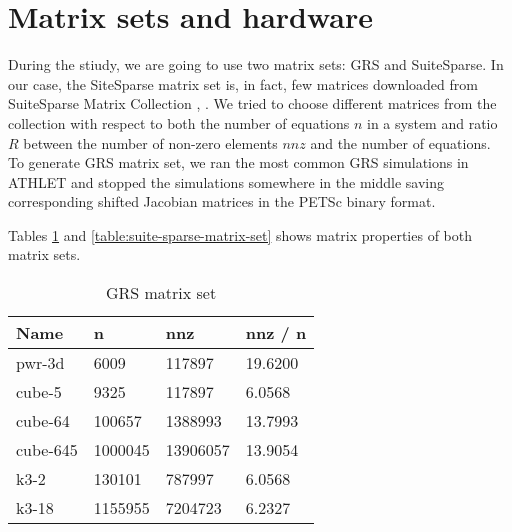 \section{Matrix sets and hardware} \label{subseq:matrix-sets-and-hardware}

During the stiudy, we are going to use two matrix sets: GRS and SuiteSparse. In our case, the SiteSparse matrix set is, in fact, few matrices downloaded from SuiteSparse Matrix Collection \cite{sparse-matrix-collection:1}, \cite{sparse-matrix-collection:2}. We tried to choose different matrices from the collection with respect to both the number of equations $n$ in a system and ratio $R$ between the number of non-zero elements $nnz$ and the number of equations.\\ 


To generate GRS matrix set, we ran the most common GRS simulations in ATHLET and stopped the simulations somewhere in the middle saving corresponding shifted Jacobian matrices in the PETSc binary format.\\

Tables \ref{table:grs-matrix-set}  and \ref{table:suite-sparse-matrix-set} shows matrix properties of both matrix sets.\\


\begin{table}[ht]
\centering
\begin{tabular}{|l|l|l|l|}
\hline
Name     & n       & nnz      & nnz / n \\ \hline
pwr-3d   & 6009    & 117897   & 19.6200 \\ \hline
cube-5   & 9325    & 117897   & 6.0568  \\ \hline
cube-64  & 100657  & 1388993  & 13.7993 \\ \hline
cube-645 & 1000045 & 13906057 & 13.9054 \\ \hline
k3-2     & 130101  & 787997   & 6.0568  \\ \hline
k3-18    & 1155955 & 7204723  & 6.2327  \\ \hline
\end{tabular}
\caption{GRS matrix set}
\label{table:grs-matrix-set}
\end{table}



